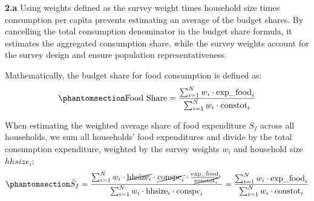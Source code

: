 \documentclass[
  letterpaper,
  DIV=11,
  numbers=noendperiod]{scrartcl}
\begin{document}
\textbf{2.a} Using weights defined as the survey weight times household
size times consumption per capita prevents estimating an average of the
budget shares. By cancelling the total consumption denominator in the
budget share formula, it estimates the aggregated consumption share,
while the survey weights account for the survey design and ensure
population representativeness.

Mathematically, the budget share for food consumption is defined as:
\begin{equation}\protect\phantomsection\label{eq-food-share}{
\text{Food Share} = \frac{\sum_{i=1}^{N} w_i \cdot \text{exp\_food}_i}{\sum_{i=1}^{N} w_i \cdot \text{constot}_i}
}\end{equation}

When estimating the weighted average share of food expenditure \(S_f\)
across all households, we sum all households' food expenditures and
divide by the total consumption expenditure, weighted by the survey
weights \(w_i\) and household size \(hhsize_i\):
\begin{equation}\protect\phantomsection\label{eq-food-share-derivation}{
\hat{S}_f = \frac{\sum_{i=1}^{N} w_i \cdot \cancel{\text{hhsize}_i} \cdot \cancel{\text{conspc}_i} \cdot \frac{\text{exp\_food}_i}{\cancel{\text{constot}_i}}}{\sum_{i=1}^{N} w_i \cdot \text{hhsize}_i \cdot \text{conspc}_i} = \frac{\sum_{i=1}^{N} w_i \cdot \text{exp\_food}_i}{\sum_{i=1}^{N} w_i \cdot \text{constot}_i}
}\end{equation}
\end{document}
